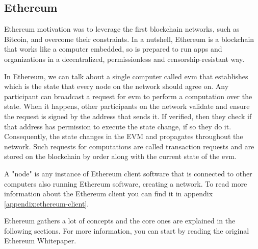 \subsection{Ethereum}
{
Ethereum motivation was to leverage the first blockchain networks, such as Bitcoin, and overcome their constraints. In a nutshell, Ethereum is a blockchain that works like a computer embedded, so is prepared to run apps and organizations in a decentralized, permissionless and censorship-resistant way.

In Ethereum, we can talk about a single computer called \acrfull{evm} that establishes which is the state that every node on the network should agree on. Any participant can broadcast a request for \acrshort{evm} to perform a computation over the state. When it happens, other participants on the network validate and ensure the request is signed by the address that sends it. If verified, then they check if that address has permission to execute the state change, if so they do it. Consequently, the state changes in the EVM and propagates throughout the network. Such requests for computations are called transaction requests and are stored on the blockchain by order along with the current state of the \acrshort{evm}. 

A "node" is any instance of Ethereum client software that is connected to other computers also running Ethereum software, creating a network. To read more information about the Ethereum client you can find it in appendix \ref{appendix:ethereum-client}.

Ethereum gathers a lot of concepts and the core ones are explained in the following sections. For more information, you can start by reading the original {Ethereum Whitepaper}\cite{ethereum-whitepaper}.
}

